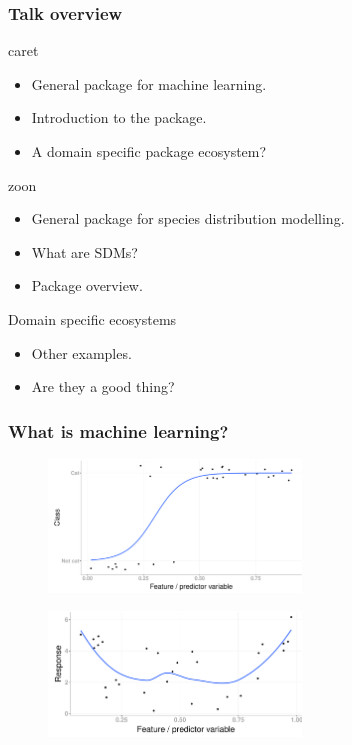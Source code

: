 \documentclass{beamer}
\begin{document}
\begin{frame}
\frametitle{Talk overview}
\begin{block}{caret}
	\begin{itemize}
	\item General package for machine learning.
	\item Introduction to the package.
    \item A domain specific package ecosystem?
	\end{itemize}
\end{block}
\begin{block}{zoon}
	\begin{itemize}
		\item General package for species distribution modelling.
    \item What are SDMs?
    \item Package overview.
	\end{itemize}

\end{block}



\begin{block}{Domain specific ecosystems}

	\begin{itemize}
	\item Other examples.
	\item Are they a good thing?
	\end{itemize}
\end{block}

\end{frame} 












\begin{frame}
\frametitle{What is machine learning?}
\begin{figure}
    \includegraphics[width = 0.6\textwidth]{classification}
\end{figure} 
\begin{figure}

    \includegraphics[width = 0.6\textwidth]{regression}
\end{figure} 
\end{frame} 
\end{document}
